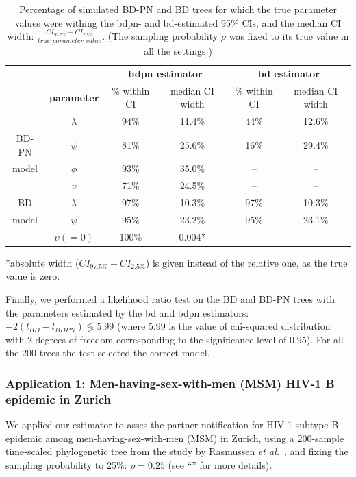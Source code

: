 \documentclass[10pt,letterpaper]{article}
\begin{document}
 \begin{table}[!h]\centering
\small
\caption{Percentage of simulated BD-PN and BD trees for which the true parameter values were withing the bdpn- and bd-estimated 95\% CIs, and the median CI width: $\frac{CI_{97.5\%} - CI_{2.5\%}}{\textit{true parameter value}}$. (The sampling probability $\rho$ was fixed to its true value in all the settings.)  \smallskip}
\begin{tabular}{c|c|cc|cc}
& & \multicolumn{2}{c|}{\textbf{bdpn estimator}} &  \multicolumn{2}{c}{\textbf{bd estimator}} \\
& \textbf{parameter} & \multicolumn{1}{c|}{\% within CI} & median CI width & \multicolumn{1}{c|}{\% within CI} & median CI width \\
\toprule 
& $\lambda$ & 94\% & 11.4\%& 44\% & 12.6\%\\
BD-PN & $\psi$ & 81\% & 25.6\% & 16\% & 29.4\%\\
model &  $\phi$ & 93\% & 35.0\% & -- & --\\
& $\upsilon$ & 71\% & 24.5\% & -- & --\\
\midrule
BD & $\lambda$ & 97\% & 10.3\%& 97\% & 10.3\%\\
model & $\psi$ & 95\% & 23.2\% & 95\% & 23.1\%\\
& $\upsilon(=0)$ & 100\% & 0.004* & -- & --\\
\bottomrule
\end{tabular}
\begin{flushleft} *absolute width ($CI_{97.5\%} - CI_{2.5\%}$) is given instead of the relative one, as the true value is zero.
\end{flushleft}
\label{tbl:ci}
\end{table}

Finally, we performed a likelihood ratio test on the BD and BD-PN trees with the parameters estimated by the bd and bdpn estimators: $-2 (l_{BD} - l_{BDPN}) \lessgtr 5.99$ (where 5.99 is the value of chi-squared distribution with 2 degrees of freedom corresponding to the significance level of $0.95$). For all the 200 trees the test selected the correct model.

\subsubsection*{Application 1: Men-having-sex-with-men (MSM) HIV-1 B epidemic in Zurich}
We applied our estimator to asses the partner notification for HIV-1 subtype B epidemic among men-having-sex-with-men (MSM) in Zurich, using a 200-sample time-scaled phylogenetic tree from the study by Rasmussen \textit{et al.}~\cite{Rasmussen2017}, and fixing the sampling probability to 25\%: $\rho=0.25$ (see ``'' for more details).
\end{document}
